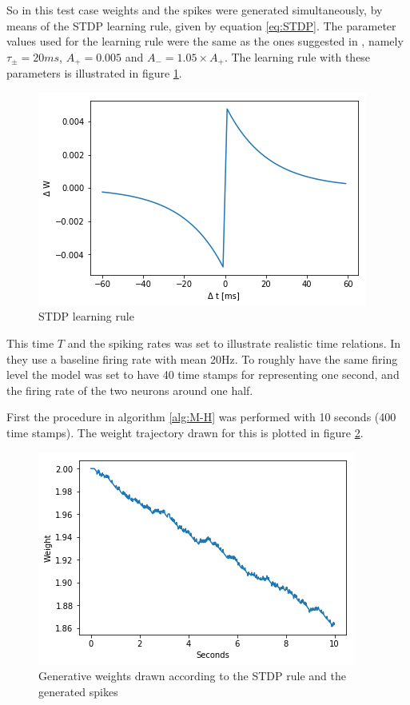 So in this test case weights and the spikes were generated simultaneously, by means of the STDP learning rule, given by equation \ref{eq:STDP}. The parameter values used for the learning rule were the same as the ones suggested in \cite{Song}, namely $\tau_{\pm} = 20 ms$, $A_+ = 0.005$ and $A_- = 1.05 \times A_+$. The learning rule with these parameters is illustrated in figure \ref{fig:LR}.

\begin{figure}[hbt!]
\caption{STDP learning rule}
\label{fig:LR}
    \centering
    \includegraphics[scale=0.8]{fig/Learning_rule2.png}
\end{figure}

This time $T$ and the spiking rates was set to illustrate realistic time relations. In \cite{Linderman} they use a baseline firing rate with mean 20Hz. To roughly have the same firing level the model was set to have 40 time stamps for representing one second, and the firing rate of the two neurons around one half. 

First the procedure in algorithm \ref{alg:M-H} was performed with 10 seconds (400 time stamps). The weight trajectory drawn for this is plotted in figure \ref{fig:w_STDP}. 


\begin{figure}[hbt!]
\caption{Generative weights drawn according to the STDP rule and the generated spikes}
\label{fig:w_STDP}
    \centering
    \includegraphics[scale=0.8]{fig/LR_underllying.png}
\end{figure}

